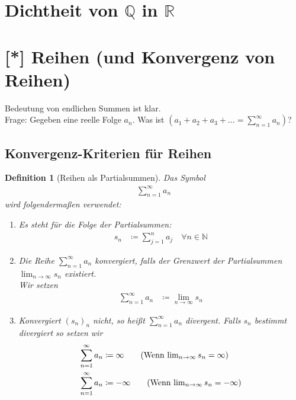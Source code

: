\documentclass[11pt, twoside, a4paper]{article}
\theoremstyle{plain}
\newtheorem{definition}[blockelement]{Definition}
\newcommand{\pair}[1]{\left(#1\right)}
\newcommand{\fromto}{\rightarrow{}}
\newcommand{\definedas}[0]{\coloneqq}
\newcommand{\R}{\mathbb{R}}
\newcommand{\N}{\mathbb{N}}
\newcommand{\Q}{\mathbb{Q}}
\begin{document}
    \section{Dichtheit von $\Q$ in $\R$}
    


    \section{[*] Reihen (und Konvergenz von Reihen)}
    \thispagestyle{pagenumberonly}

    Bedeutung von endlichen Summen ist klar.\\
    Frage: Gegeben eine reelle Folge $a_n$. Was ist $\pair{a_1 + a_2 + a_3 + \dots = \sum_{n=1}^{\infty} a_n}$?

    \subsection{Konvergenz-Kriterien für Reihen}

    \begin{definition}[Reihen als Partialsummen] %
        Das Symbol
        \begin{align*}
            \sum_{n=1}^{\infty} a_n\tag{Sei $a_n$ eine reelle Folge}
        \end{align*}
        wird folgendermaßen verwendet:

        \begin{enumerate}[label=\alph*)]
            \item Es steht für die Folge der Partialsummen:
            \begin{align*}
                s_n&\definedas \sum_{j=1}^{n} a_j\quad\forall n\in\N
            \end{align*}
            \item Die Reihe $\sum_{n=1}^{\infty} a_n$ konvergiert, falls der Grenzwert der Partialsummen $\lim_{n\fromto\infty} s_n$ existiert.\\
            Wir setzen
            \begin{align*}
                \sum_{n=1}^{\infty} a_n &\definedas \lim_{n\fromto\infty} s_n
            \end{align*}
            \item Konvergiert $(s_n)_n$ nicht, so heißt $\sum_{n=1}^{\infty} a_n$ divergent. Falls $s_n$ bestimmt divergiert so setzen wir
            \begin{align*}
                \sum_{n=1}^{\infty} a_n &\definedas \infty \tag{Wenn $\lim_{n\fromto\infty} s_n = \infty$}\\
                \sum_{n=1}^{\infty} a_n &\definedas -\infty \tag{Wenn $\lim_{n\fromto\infty} s_n = -\infty$}
            \end{align*}
        \end{enumerate}
    \end{definition}
\end{document}
